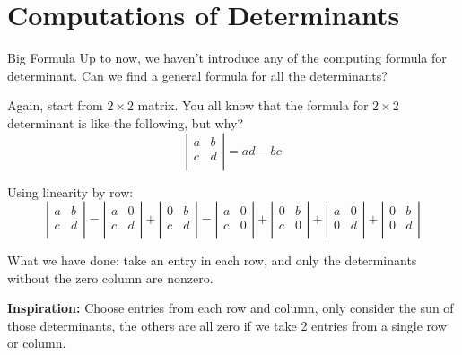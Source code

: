\documentclass{beamer}
\begin{document}
\section{Computations of Determinants}
\begin{frame}{Big Formula}
Up to now, we haven't introduce any of the computing formula for determinant. Can we find a general formula for all the determinants?

\vspace{3pt}
Again, start from $2\times 2$ matrix. You all know that the formula for $2\times 2$ determinant is like the following, but why?
\begin{equation*}
    \left| \begin{matrix}
        a&		b\\
        c&		d\\
    \end{matrix} \right|=ad-bc
\end{equation*}

Using linearity by row:
\begin{equation*}
    \left| \begin{matrix}
        a&		b\\
        c&		d\\
    \end{matrix} \right|=\left| \begin{matrix}
        a&		0\\
        c&		d\\
    \end{matrix} \right|+\left| \begin{matrix}
        0&		b\\
        c&		d\\
    \end{matrix} \right|=\left| \begin{matrix}
        a&		0\\
        c&		0\\
    \end{matrix} \right|+\left| \begin{matrix}
        0&		b\\
        c&		0\\
    \end{matrix} \right|+\left| \begin{matrix}
        a&		0\\
        0&		d\\
    \end{matrix} \right|+\left| \begin{matrix}
        0&		b\\
        0&		d\\
    \end{matrix} \right|
\end{equation*}

What we have done: take an entry in each row, and only the determinants without the zero column are nonzero.

\vspace{3pt}
\textbf{Inspiration:} Choose entries from each row and column, only consider the sun of those determinants, the others are all zero if we take 2 entries from a single row or column.
\end{frame}
\end{document}
